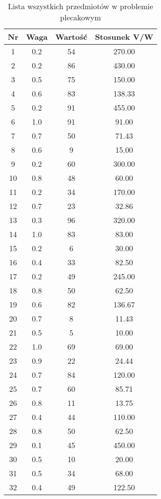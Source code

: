 \begin{table}[h!]
\centering
\begin{tabular}{|c|c|c|c|}
\hline
Nr & Waga & Wartość & Stosunek V/W \\
\hline
1 & 0.2 & 54 & 270.00 \\
2 & 0.2 & 86 & 430.00 \\
3 & 0.5 & 75 & 150.00 \\
4 & 0.6 & 83 & 138.33 \\
5 & 0.2 & 91 & 455.00 \\
6 & 1.0 & 91 & 91.00 \\
7 & 0.7 & 50 & 71.43 \\
8 & 0.6 & 9 & 15.00 \\
9 & 0.2 & 60 & 300.00 \\
10 & 0.8 & 48 & 60.00 \\
11 & 0.2 & 34 & 170.00 \\
12 & 0.7 & 23 & 32.86 \\
13 & 0.3 & 96 & 320.00 \\
14 & 1.0 & 83 & 83.00 \\
15 & 0.2 & 6 & 30.00 \\
16 & 0.4 & 33 & 82.50 \\
17 & 0.2 & 49 & 245.00 \\
18 & 0.8 & 50 & 62.50 \\
19 & 0.6 & 82 & 136.67 \\
20 & 0.7 & 8 & 11.43 \\
21 & 0.5 & 5 & 10.00 \\
22 & 1.0 & 69 & 69.00 \\
23 & 0.9 & 22 & 24.44 \\
24 & 0.7 & 84 & 120.00 \\
25 & 0.7 & 60 & 85.71 \\
26 & 0.8 & 11 & 13.75 \\
27 & 0.4 & 44 & 110.00 \\
28 & 0.8 & 50 & 62.50 \\
29 & 0.1 & 45 & 450.00 \\
30 & 0.5 & 10 & 20.00 \\
31 & 0.5 & 34 & 68.00 \\
32 & 0.4 & 49 & 122.50 \\
\hline
\end{tabular}
\caption{Lista wszystkich przedmiotów w problemie plecakowym}
\label{tab:all_items}
\end{table}
